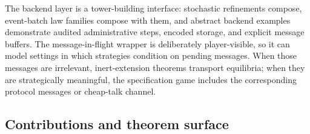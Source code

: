 The backend layer is a tower-building interface: stochastic refinements
compose, event-batch law families compose with them, and abstract backend
examples demonstrate audited administrative steps, encoded storage, and
explicit message buffers.  The message-in-flight wrapper is deliberately
player-visible, so it can model settings in which strategies condition
on pending messages.  When those messages are irrelevant,
inert-extension theorems transport equilibria; when they are
strategically meaningful, the specification game includes the
corresponding protocol messages or cheap-talk channel.

\subsection{Contributions and theorem surface}
\label{sec:intro:contributions}

